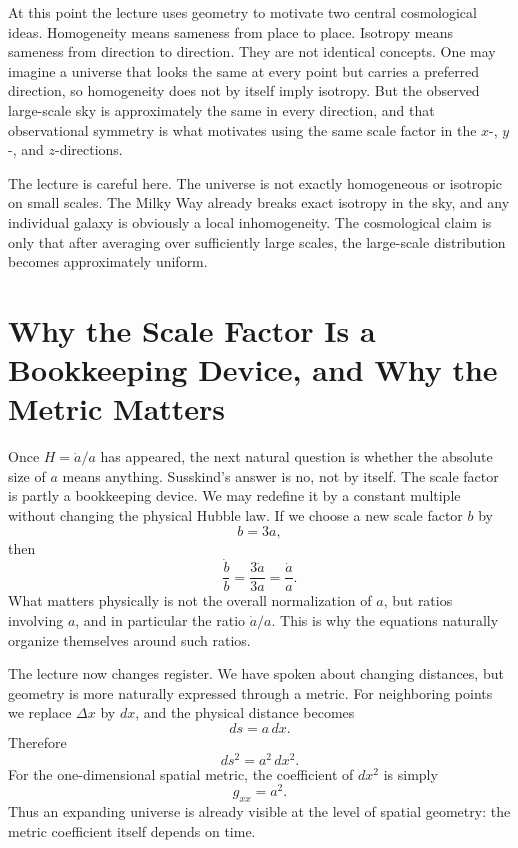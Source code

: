 At this point the lecture uses geometry to motivate two central cosmological ideas. Homogeneity means sameness from place to place. Isotropy means sameness from direction to direction. They are not identical concepts. One may imagine a universe that looks the same at every point but carries a preferred direction, so homogeneity does not by itself imply isotropy. But the observed large-scale sky is approximately the same in every direction, and that observational symmetry is what motivates using the same scale factor in the \(x\)-, \(y\)-, and \(z\)-directions.

The lecture is careful here. The universe is not exactly homogeneous or isotropic on small scales. The Milky Way already breaks exact isotropy in the sky, and any individual galaxy is obviously a local inhomogeneity. The cosmological claim is only that after averaging over sufficiently large scales, the large-scale distribution becomes approximately uniform.

\section{Why the Scale Factor Is a Bookkeeping Device, and Why the Metric Matters}

Once \(H=\dot a/a\) has appeared, the next natural question is whether the absolute size of \(a\) means anything. Susskind's answer is no, not by itself. The scale factor is partly a bookkeeping device. We may redefine it by a constant multiple without changing the physical Hubble law. If we choose a new scale factor \(b\) by
\begin{equation}
b=3a,
\end{equation}
then
\begin{equation}
\frac{\dot b}{b}=\frac{3\dot a}{3a}=\frac{\dot a}{a}.
\end{equation}
What matters physically is not the overall normalization of \(a\), but ratios involving \(a\), and in particular the ratio \(\dot a/a\). This is why the equations naturally organize themselves around such ratios.

The lecture now changes register. We have spoken about changing distances, but geometry is more naturally expressed through a metric. For neighboring points we replace \(\Delta x\) by \(dx\), and the physical distance becomes
\begin{equation}
ds=a\,dx.
\end{equation}
Therefore
\begin{equation}
ds^2=a^2\,dx^2.
\end{equation}
For the one-dimensional spatial metric, the coefficient of \(dx^2\) is simply
\begin{equation}
g_{xx}=a^2.
\end{equation}
Thus an expanding universe is already visible at the level of spatial geometry: the metric coefficient itself depends on time.

